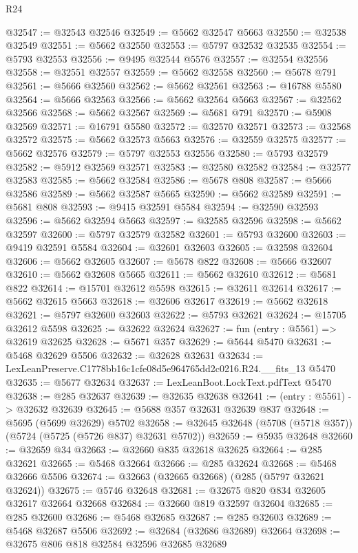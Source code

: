\begin{lexlean}{R24}
\begin{coremodule}
@32547 := @32543 @32546
@32549 := @5662 @32547 @5663
@32550 := @32538 @32549
@32551 := @5662 @32550
@32553 := @5797 @32532 @32535
@32554 := @5793 @32553
@32556 := @9495 @32544 @5576
@32557 := @32554 @32556
@32558 := @32551 @32557
@32559 := @5662 @32558
@32560 := @5678 @791
@32561 := @5666 @32560
@32562 := @5662 @32561
@32563 := @16788 @5580
@32564 := @5666 @32563
@32566 := @5662 @32564 @5663
@32567 := @32562 @32566
@32568 := @5662 @32567
@32569 := @5681 @791
@32570 := @5908 @32569
@32571 := @16791 @5580
@32572 := @32570 @32571
@32573 := @32568 @32572
@32575 := @5662 @32573 @5663
@32576 := @32559 @32575
@32577 := @5662 @32576
@32579 := @5797 @32553 @32556
@32580 := @5793 @32579
@32582 := @5912 @32569 @32571
@32583 := @32580 @32582
@32584 := @32577 @32583
@32585 := @5662 @32584
@32586 := @5678 @808
@32587 := @5666 @32586
@32589 := @5662 @32587 @5665
@32590 := @5662 @32589
@32591 := @5681 @808
@32593 := @9415 @32591 @5584
@32594 := @32590 @32593
@32596 := @5662 @32594 @5663
@32597 := @32585 @32596
@32598 := @5662 @32597
@32600 := @5797 @32579 @32582
@32601 := @5793 @32600
@32603 := @9419 @32591 @5584
@32604 := @32601 @32603
@32605 := @32598 @32604
@32606 := @5662 @32605
@32607 := @5678 @822
@32608 := @5666 @32607
@32610 := @5662 @32608 @5665
@32611 := @5662 @32610
@32612 := @5681 @822
@32614 := @15701 @32612 @5598
@32615 := @32611 @32614
@32617 := @5662 @32615 @5663
@32618 := @32606 @32617
@32619 := @5662 @32618
@32621 := @5797 @32600 @32603
@32622 := @5793 @32621
@32624 := @15705 @32612 @5598
@32625 := @32622 @32624
@32627 := fun (entry : @5561) => @32619 @32625
@32628 := @5671 @357
@32629 := @5644 @5470
@32631 := @5468 @32629 @5506
@32632 := @32628 @32631
@32634 := LexLeanPreserve.C1778bb16c1cfe08d5e964765dd2c0216.R24.__fits_13 @5470
@32635 := @5677 @32634
@32637 := LexLeanBoot.LockText.pdfText @5470
@32638 := @285 @32637
@32639 := @32635 @32638
@32641 := (entry : @5561) -> @32632 @32639
@32645 := @5688 @357 @32631 @32639 @837
@32648 := @5695 (@5699 @32629) @5702
@32658 := @32645 @32648 (@5708 (@5718 @357)) (@5724 (@5725 (@5726 @837) @32631 @5702))
@32659 := @5935 @32648
@32660 := @32659 @34
@32663 := @32660 @835 @32618 @32625
@32664 := @285 @32621
@32665 := @5468 @32664
@32666 := @285 @32624
@32668 := @5468 @32666 @5506
@32674 := @32663 (@32665 @32668) (@285 (@5797 @32621 @32624))
@32675 := @5746 @32648
@32681 := @32675 @820 @834 @32605 @32617 @32664 @32668
@32684 := @32660 @819 @32597 @32604
@32685 := @285 @32600
@32686 := @5468 @32685
@32687 := @285 @32603
@32689 := @5468 @32687 @5506
@32692 := @32684 (@32686 @32689) @32664
@32698 := @32675 @806 @818 @32584 @32596 @32685 @32689

\end{coremodule}
\end{lexlean}
